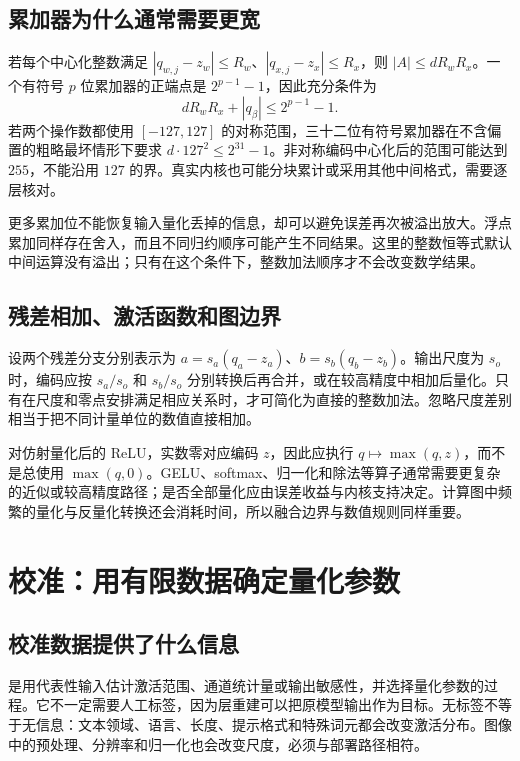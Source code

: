 \documentclass[UTF8,12pt,a4paper,fontset=fandol]{ctexart}
\begin{document}
\subsection{累加器为什么通常需要更宽}
若每个中心化整数满足 $|q_{w,j}-z_w|\leq R_w$、$|q_{x,j}-z_x|\leq R_x$，则 $|A|\leq dR_wR_x$。一个有符号 $p$ 位累加器的正端点是 $2^{p-1}-1$，因此充分条件为
\begin{equation}
 dR_wR_x+|q_\beta|\leq2^{p-1}-1.
 \label{eq:quant-overflow}
\end{equation}
若两个操作数都使用 $[-127,127]$ 的对称范围，三十二位有符号累加器在不含偏置的粗略最坏情形下要求 $d\cdot127^2\leq2^{31}-1$。非对称编码中心化后的范围可能达到 $255$，不能沿用 $127$ 的界。真实内核也可能分块累计或采用其他中间格式，需要逐层核对。

更多累加位不能恢复输入量化丢掉的信息，却可以避免误差再次被溢出放大。浮点累加同样存在舍入，而且不同归约顺序可能产生不同结果。这里的整数恒等式默认中间运算没有溢出；只有在这个条件下，整数加法顺序才不会改变数学结果。

\subsection{残差相加、激活函数和图边界}
设两个残差分支分别表示为 $a=s_a(q_a-z_a)$、$b=s_b(q_b-z_b)$。输出尺度为 $s_o$ 时，编码应按 $s_a/s_o$ 和 $s_b/s_o$ 分别转换后再合并，或在较高精度中相加后量化。只有在尺度和零点安排满足相应关系时，才可简化为直接的整数加法。忽略尺度差别相当于把不同计量单位的数值直接相加。

对仿射量化后的 ReLU，实数零对应编码 $z$，因此应执行 $q\mapsto\max(q,z)$，而不是总使用 $\max(q,0)$。GELU、softmax、归一化和除法等算子通常需要更复杂的近似或较高精度路径；是否全部量化应由误差收益与内核支持决定。计算图中频繁的量化与反量化转换还会消耗时间，所以融合边界与数值规则同样重要。

\section{校准：用有限数据确定量化参数}
\label{sec:quant-calibration}

\subsection{校准数据提供了什么信息}
是用代表性输入估计激活范围、通道统计量或输出敏感性，并选择量化参数的过程。它不一定需要人工标签，因为层重建可以把原模型输出作为目标。无标签不等于无信息：文本领域、语言、长度、提示格式和特殊词元都会改变激活分布。图像中的预处理、分辨率和归一化也会改变尺度，必须与部署路径相符。
\end{document}
